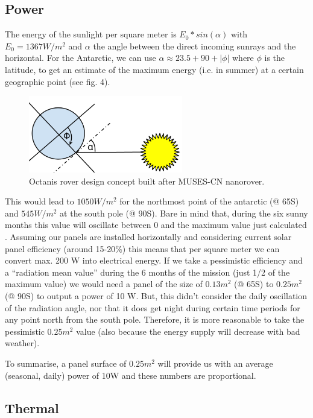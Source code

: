 \documentclass[a4paper,12pt]{article}
\begin{document}
\subsection{Power}

The energy of the sunlight per square meter is $E_0*sin(\alpha)$ with $E_0=1367 W/m^2$ \cite{solarc} and $\alpha$ the angle between the direct incoming sunrays and the horizontal. For the Antarctic, we can use $\alpha \approx 23.5+90+|\phi|$ where $\phi$ is the latitude, to get an estimate of the maximum energy (i.e. in summer) at a certain geographic point (see fig. 4).


\begin{figure}[h!]
	\centering
    \includegraphics[width=0.6\textwidth]{sun}
    \caption{Octanis rover design concept built after MUSES-CN nanorover.}
\end{figure}


 This would lead to $1050 W/m^2$ for the northmost point of the antarctic (@ 65\degree S) and $545 W/m^2$ at the south pole (@ 90\degree S). Bare in mind that, during the six sunny months this value will oscillate between 0 and the maximum value just calculated \cite{pvedu}. 
Assuming our panels are installed horizontally and considering current solar panel efficiency (around 15-20\%) this means that per square meter we can convert max. 200 W into electrical energy. If we take a pessimistic efficiency and a “radiation mean value” during the 6 months of the mission (just 1/2 of the maximum value) we would need a panel of the size of $0.13m^2$ (@ 65\degree S) to $0.25m^2$ (@ 90\degree S) to output a power of 10 W. But, this didn’t consider the daily oscillation of the radiation angle, nor that it does get night during certain time periods for any point north from the south pole. Therefore, it is more reasonable to take the pessimistic $0.25m^2$ value (also because the energy supply will decrease with bad weather).

To summarise, a panel surface of $0.25m^2$ will provide us with an average (seasonal, daily) power of 10W and these numbers are proportional. 


\subsection{Thermal}
\end{document}
